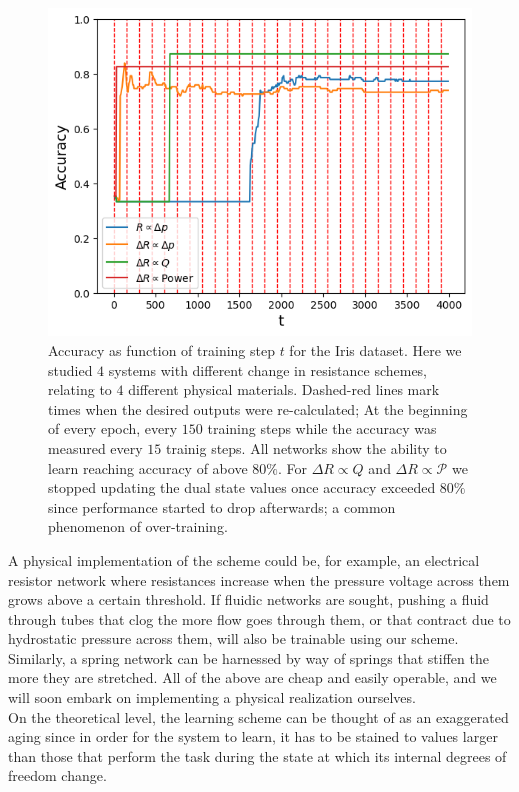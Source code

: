 \documentclass[%
 reprint,
 amsmath,amssymb,
 aps,
]{revtex4-2}
\begin{document}
    \begin{figure}[ht]
    \centerline{
    \includegraphics[width=\columnwidth]{Figures/accuracy_vs_t_4_materials.png}
    }
    \caption{Accuracy as function of training step $t$ for the Iris dataset. Here we studied $4$ systems with different change in resistance schemes, relating to $4$ different physical materials. Dashed-red lines mark times when the desired outputs were re-calculated; At the beginning of every epoch, every $150$ training steps while the accuracy was measured every $15$ trainig steps. All networks show the ability to learn reaching accuracy of above $80\%$. For $\Delta R\propto Q$ and $\Delta R \propto \mathcal{P}$ we stopped updating the dual state values once accuracy exceeded $80\%$ since performance started to drop afterwards; a common phenomenon of over-training.}
    \label{fig:accuracy_4_materials}
    \end{figure}
    
    A physical implementation of the scheme could be, for example, an electrical resistor network where resistances increase when the pressure voltage across them grows above a certain threshold. If fluidic networks are sought, pushing a fluid through tubes that clog the more flow goes through them, or that contract due to hydrostatic pressure across them, will also be trainable using our scheme. Similarly, a spring network can be harnessed by way of springs that stiffen the more they are stretched. All of the above are cheap and easily operable, and we will soon embark on implementing a physical realization ourselves.\\ 
    On the theoretical level, the learning scheme can be thought of as an exaggerated aging since in order for the system to learn, it has to be stained to values larger than those that perform the task during the state at which its internal degrees of freedom change.
\end{document}
